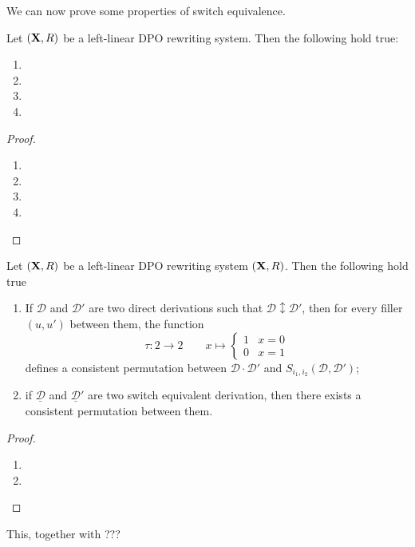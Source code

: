 \documentclass[a4paper,UKenglish,cleveref,pdftex, thm-restate,numberwithinsect]{lipics}
\def\R{\mathsf{R}}
\def\X{\textbf {\textup{X}}}
\newcommand{\dder}[1]{\mathscr{#1}}
\newcommand{\sder}[2]{S_{i_1,i_2}(\mathscr{#1}, \mathscr{#2})}
\newcommand{\der}[1]{\underline{\dder{#1}}}
\begin{document}
\begin{example}
\end{example}

We can now prove some properties of switch equivalence.
\begin{lemma}Let $(\X, \R)$ be a left-linear DPO rewriting system. Then the following hold true: 
	\begin{enumerate}
		\item 
		\item 
		\item 
		\item 
	\end{enumerate}
\end{lemma}
\begin{proof}\begin{enumerate}
		\item 
		\item 
		\item 
		\item \qedhere 
	\end{enumerate}
\end{proof}


\begin{example}
\end{example}



\begin{lemma}\label{lem:consperm} Let $(\X, \R)$ be a left-linear DPO rewriting system $(\X, \R)$. Then the following hold true
	\begin{enumerate}
		\item If $\dder{D}$ and $\dder{D'}$ are two direct derivations such that $\dder{D}\updownarrow \dder{D'}$, then for every filler $(u,u')$ between them, the function
		\[\tau\colon 2\to2 \qquad x \mapsto \begin{cases}
			1 & x=0\\
			0 & x=1
		\end{cases}\]
		defines a consistent permutation between $\dder{D}\cdot \dder{D}'$ and $\sder{D}{D'}$;
		\item if $\der{D}$ and $\der{D}'$ are two switch equivalent derivation, then there exists a consistent permutation between them.
	\end{enumerate}
\end{lemma}
\begin{proof}
	\begin{enumerate}
		\item 
		\item \qedhere 
	\end{enumerate}
\end{proof}
This, together with ???
\begin{corollary}
\end{corollary}
\end{document}
